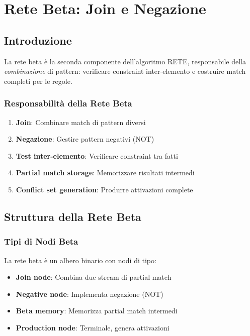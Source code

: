 
\chapter{Rete Beta: Join e Negazione}
\label{cap:rete_beta}

\section{Introduzione}

La rete beta è la seconda componente dell'algoritmo RETE, responsabile della \textit{combinazione} di pattern: verificare constraint inter-elemento e costruire match completi per le regole.

\subsection{Responsabilità della Rete Beta}

\begin{infobox}
\begin{enumerate}
\item \textbf{Join}: Combinare match di pattern diversi
\item \textbf{Negazione}: Gestire pattern negativi (NOT)
\item \textbf{Test inter-elemento}: Verificare constraint tra fatti
\item \textbf{Partial match storage}: Memorizzare risultati intermedi
\item \textbf{Conflict set generation}: Produrre attivazioni complete
\end{enumerate}
\end{infobox}

\section{Struttura della Rete Beta}

\subsection{Tipi di Nodi Beta}

\begin{definizione}
La rete beta è un albero binario con nodi di tipo:
\begin{itemize}
\item \textbf{Join node}: Combina due stream di partial match
\item \textbf{Negative node}: Implementa negazione (NOT)
\item \textbf{Beta memory}: Memorizza partial match intermedi
\item \textbf{Production node}: Terminale, genera attivazioni
\end{itemize}
\end{definizione}

